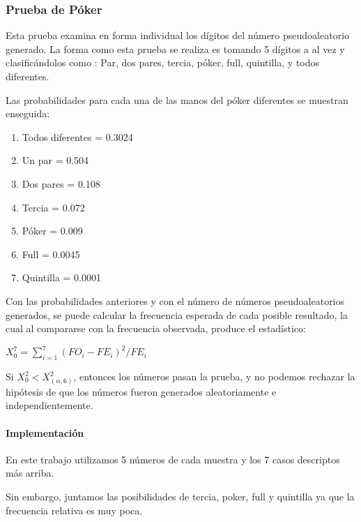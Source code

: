 \subsubsection{Prueba de Póker}
Esta prueba examina en forma individual los dígitos del número pseudoaleatorio generado. La forma como esta prueba se
realiza es tomando 5 dígitos a al vez y clasificándolos como : Par, dos pares, tercia, póker, full, quintilla, y todos
diferentes.

Las probabilidades para cada una de las manos del póker diferentes se muestran enseguida:

\begin{enumerate}
    \item Todos diferentes = 0.3024
    \item Un par = 0.504
    \item Dos pares = 0.108
    \item Tercia = 0.072
    \item Póker = 0.009
    \item Full = 0.0045
    \item Quintilla = 0.0001
\end{enumerate}

Con las probabilidades anteriores y con el número de números pseudoaleatorios generados, se puede calcular la frecuencia
esperada de cada posible resultado, la cual al compararse con la frecuencia observada, produce el estadístico:

$X^7_0 = \sum_{i=1}^{7} (FO_i-FE_i)^2/FE_i$

Si $X^2_0 < X^2_(\alpha,6)$, entonces los números pasan la prueba, y no podemos rechazar la hipótesis de que los números
fueron generados aleatoriamente e independientemente.

\paragraph{Implementación}
En este trabajo utilizamos 5 números de cada muestra y los 7 casos descriptos más arriba.

Sin embargo, juntamos las posibilidades de tercia, poker, full y quintilla ya que la frecuencia relativa es muy poca.
